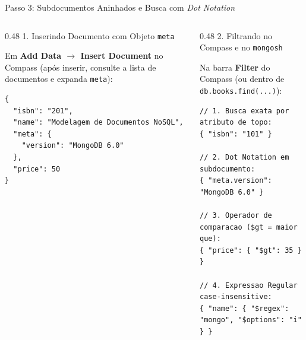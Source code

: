 \begin{frame}[fragile]{Passo 3: Subdocumentos Aninhados e Busca com \textit{Dot Notation}}
  \vspace{0.05cm}
  \begin{columns}[t]
    \begin{column}{0.48\textwidth}
      \alert{1. Inserindo Documento com Objeto \texttt{meta}}\par
      \scriptsize
      Em \textbf{Add Data $\to$ Insert Document} no Compass (após inserir, consulte a lista de documentos e expanda \texttt{meta}):
      \begin{lstlisting}[language=mongosh]
{
  "isbn": "201",
  "name": "Modelagem de Documentos NoSQL",
  "meta": {
    "version": "MongoDB 6.0"
  },
  "price": 50
}
      \end{lstlisting}
    \end{column}
    \begin{column}{0.48\textwidth}
      \alert{2. Filtrando no Compass e no \texttt{mongosh}}\par
      \scriptsize
      Na barra \textbf{Filter} do Compass (ou dentro de \texttt{db.books.find(...)}):
      \begin{lstlisting}[language=mongosh]
// 1. Busca exata por atributo de topo:
{ "isbn": "101" }

// 2. Dot Notation em subdocumento:
{ "meta.version": "MongoDB 6.0" }

// 3. Operador de comparacao ($gt = maior que):
{ "price": { "$gt": 35 } }

// 4. Expressao Regular case-insensitive:
{ "name": { "$regex": "mongo", "$options": "i" } }
      \end{lstlisting}
    \end{column}
  \end{columns}
\end{frame}

